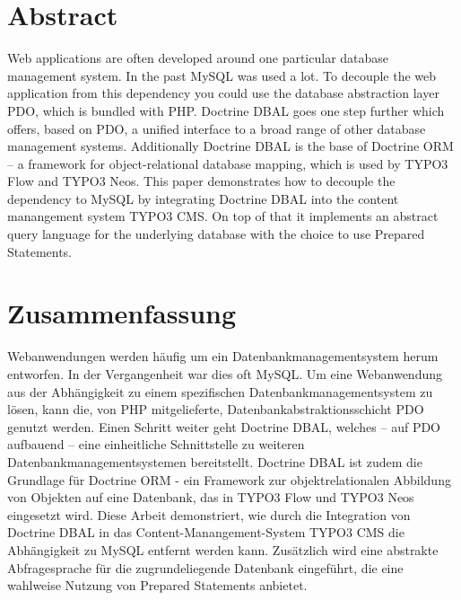 \begingroup
\let\clearpage\relax
\let\cleardoublepage\relax
\let\cleardoublepage\relax

\chapter*{Abstract}
\label{ch:abstractEn}
Web applications are often developed around one particular database management system. In the past MySQL was used a lot. To decouple the web application from this dependency you could use the database abstraction layer PDO, which is bundled with PHP. Doctrine DBAL goes one step further which offers, based on PDO, a unified interface to a broad range of other database management systems. Additionally Doctrine DBAL is the base of Doctrine ORM – a framework for object-relational database mapping, which is used by TYPO3 Flow and TYPO3 Neos. This paper demonstrates how to decouple the dependency to MySQL by integrating Doctrine DBAL into the content manangement system TYPO3 CMS. On top of that it implements an abstract query language for the underlying database with the choice to use Prepared Statements.

\vfill

\chapter{Zusammenfassung}
\label{ch:abstractDe}
Webanwendungen werden häufig um ein Datenbankmanagementsystem herum entworfen. In der Vergangenheit war dies oft MySQL. Um eine Webanwendung aus der Abhängigkeit zu einem spezifischen Datenbankmanagementsystem zu lösen, kann die, von PHP mitgelieferte, Datenbankabstraktionsschicht PDO genutzt werden. Einen Schritt weiter geht Doctrine DBAL, welches – auf PDO aufbauend – eine einheitliche Schnittstelle zu weiteren Datenbankmanagementsystemen bereitstellt. Doctrine DBAL ist zudem die Grundlage für Doctrine ORM - ein Framework zur objektrelationalen Abbildung von Objekten auf eine Datenbank, das in TYPO3 Flow und TYPO3 Neos eingesetzt wird. Diese Arbeit demonstriert, wie durch die Integration von Doctrine DBAL in das Content-Manangement-System TYPO3 CMS die Abhängigkeit zu MySQL entfernt werden kann. Zusätzlich wird eine abstrakte Abfragesprache für die zugrundeliegende Datenbank eingeführt, die eine wahlweise Nutzung von Prepared Statements anbietet.

\endgroup
\vfill
